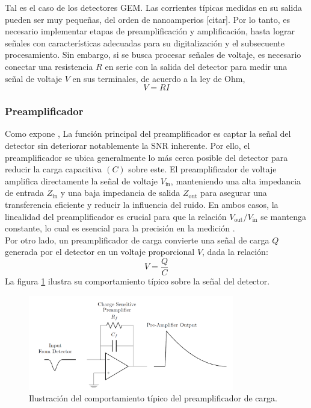 \documentclass[]{book}
\begin{document}
\noindent Tal es el caso de los detectores GEM. Las corrientes típicas medidas en su salida pueden ser muy pequeñas, del orden de nanoamperios [citar]. Por lo tanto, es necesario implementar etapas de preamplificación y amplificación, hasta lograr señales con características adecuadas para su digitalización y el subsecuente procesamiento. Sin embargo, si se busca procesar señales de voltaje, es necesario conectar una resistencia $R$ en serie con la salida del detector para medir una señal de voltaje $V$ en sus terminales, de acuerdo a la ley de Ohm, $$V = R I$$ 

\subsubsection{Preamplificador}

\noindent Como expone \cite{knoll2010radiation}, La función principal del preamplificador es captar la señal del detector sin deteriorar notablemente la SNR inherente. Por ello, el preamplificador se ubica generalmente lo más cerca posible del detector para reducir la carga capacitiva $(C)$ sobre este. El preamplificador de voltaje amplifica directamente la señal de voltaje $V_{\text{in}}$, manteniendo una alta impedancia de entrada $Z_{\text{in}}$ y una baja impedancia de salida $Z_{\text{out}}$ para asegurar una transferencia eficiente y reducir la influencia del ruido. En ambos casos, la linealidad del preamplificador es crucial para que la relación $V_{\text{out}}/ V_{\text{in}}$ se mantenga constante, lo cual es esencial para la precisión en la medición \cite{leo1994techniques}.\\

\noindent Por otro lado, un preamplificador de carga convierte una señal de carga $Q$ generada por el detector en un voltaje proporcional $V$, dada la relación: $$V = \frac{Q}{C}$$ La figura \ref{fig:preamp} ilustra su comportamiento típico sobre la señal del detector.\\

\begin{figure}[h]
    \centering
    \includegraphics[width=0.8\textwidth]{preamp.PNG}
    \caption{Ilustración del comportamiento típico del preamplificador de carga.}
    \label{fig:preamp}

\end{figure}
\end{document}
